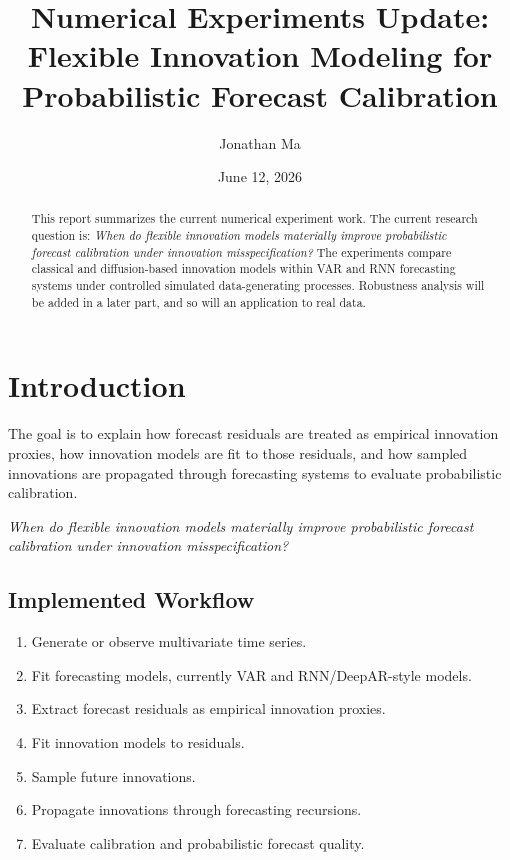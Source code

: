 \documentclass[11pt]{article}
\title{
    Numerical Experiments Update: \\
    Flexible Innovation Modeling for Probabilistic Forecast Calibration
}
\author{Jonathan Ma}
\date{June 12, 2026}
\begin{document}
\maketitle

\begin{abstract}
This report summarizes the current numerical experiment work. The current research question is: \emph{When do flexible innovation models materially improve probabilistic forecast calibration under innovation misspecification?} The experiments compare classical and diffusion-based innovation models within VAR and RNN forecasting systems under controlled simulated data-generating processes. Robustness analysis will be added in a later part, and so will an application to real data.
\end{abstract}

\tableofcontents
\newpage

\section{Introduction}

The goal is to explain how forecast residuals are treated as empirical innovation proxies, how innovation models are fit to those residuals, and how sampled innovations are propagated through forecasting systems to evaluate probabilistic calibration.

\emph{When do flexible innovation models materially improve probabilistic forecast calibration under innovation misspecification?}


\subsection{Implemented Workflow}

\begin{enumerate}
    \item Generate or observe multivariate time series.
    \item Fit forecasting models, currently VAR and RNN/DeepAR-style models.
    \item Extract forecast residuals as empirical innovation proxies.
    \item Fit innovation models to residuals.
    \item Sample future innovations.
    \item Propagate innovations through forecasting recursions.
    \item Evaluate calibration and probabilistic forecast quality.
\end{enumerate}
\end{document}

